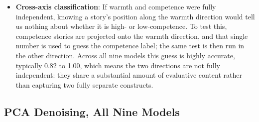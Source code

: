 \documentclass[twocolumn]{article}
\begin{document}
\begin{appendices}
\begin{itemize}[leftmargin=*, itemsep=2pt, topsep=4pt, parsep=0pt]
  built from each half using only that half's stories. The cosine between
  these two independently-built directions tells us how similar they are.
  Across all nine models, this cosine is consistently high (roughly 0.69
  to 0.82 for warmth, 0.83 to 0.90 for competence), meaning the direction
  reflects a stable property of the concept rather than an artifact of
  which 25 stories happened to end up in each half.
  \item \textbf{Cross-axis classification}: If warmth and competence were
  fully independent, knowing a story's position along the warmth
  direction would tell us nothing about whether it is high- or
  low-competence. To test this, competence stories are projected onto the
  warmth direction, and that single number is used to guess the
  competence label; the same test is then run in the other direction.
  Across all nine models this guess is highly accurate, typically 0.82 to
  1.00, which means the two directions are not fully independent: they
  share a substantial amount of evaluative content rather than capturing
  two fully separate constructs.
\end{itemize}

\subsection*{PCA Denoising, All Nine Models}
\label{appx:pca_denoising}


\end{appendices}
\end{document}
